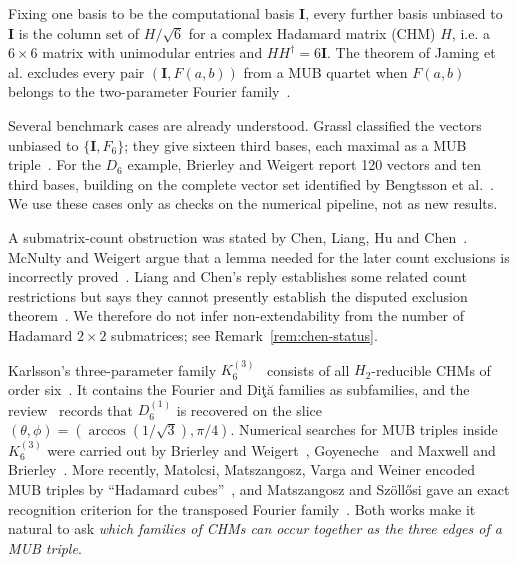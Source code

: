 \documentclass[11pt]{article}
\numberwithin{equation}{section}
\theoremstyle{plain}
\theoremstyle{definition}
\theoremstyle{remark}
\newcommand{\I}{\mathbf{I}}
\newcommand{\dg}{^{\dagger}}
\newcommand{\Dita}{\texorpdfstring{Di\c{t}\u{a}}{Dita}}
\begin{document}
Fixing one basis to be the computational basis $\I$, every further basis unbiased to $\I$ is the column set of $H/\sqrt6$ for a complex Hadamard matrix (CHM) $H$, i.e. a $6\times6$ matrix with unimodular entries and $HH\dg=6\I$. The theorem of Jaming et al. excludes every pair $(\I,F(a,b))$ from a MUB quartet when $F(a,b)$ belongs to the two-parameter Fourier family~\cite{Jaming2009}.

Several benchmark cases are already understood. Grassl classified the vectors unbiased to $\{\I,F_6\}$; they give sixteen third bases, each maximal as a MUB triple~\cite{Grassl2004}. For the $D_6$ example, Brierley and Weigert report 120 vectors and ten third bases, building on the complete vector set identified by Bengtsson et al.~\cite{Brierley2009,BengtssonMUH2007}. We use these cases only as checks on the numerical pipeline, not as new results.

A submatrix-count obstruction was stated by Chen, Liang, Hu and Chen~\cite{Chen2021}. McNulty and Weigert argue that a lemma needed for the later count exclusions is incorrectly proved~\cite{McNultyWeigert2025Comment}. Liang and Chen's reply establishes some related count restrictions but says they cannot presently establish the disputed exclusion theorem~\cite{LiangChen2025Reply}. We therefore do not infer non-extendability from the number of Hadamard $2\times2$ submatrices; see Remark~\ref{rem:chen-status}.

Karlsson's three-parameter family $K_6^{(3)}$~\cite{Karlsson2011} consists of all $H_2$-reducible CHMs of order six~\cite{KarlssonH2}. It contains the Fourier and \Dita{} families as subfamilies, and the review~\cite{McNultyWeigert2026} records that $D_6^{(1)}$ is recovered on the slice $(\theta,\phi)=(\arccos(1/\sqrt3),\pi/4)$. Numerical searches for MUB triples inside $K_6^{(3)}$ were carried out by Brierley and Weigert~\cite{Brierley2009}, Goyeneche~\cite{Goyeneche2013} and Maxwell and Brierley~\cite{MaxwellBrierley2015}. More recently, Matolcsi, Matszangosz, Varga and Weiner encoded MUB triples by ``Hadamard cubes''~\cite{Matolcsi2025}, and Matszangosz and Sz\"oll\H{o}si gave an exact recognition criterion for the transposed Fourier family~\cite{MatszangoszSzollosi2024}. Both works make it natural to ask \emph{which families of CHMs can occur together as the three edges of a MUB triple}.
\end{document}
